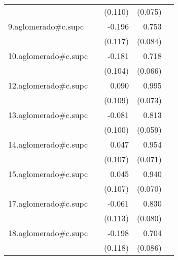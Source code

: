 {\begin{longtable}{l*{4}{D{.}{.}{-1}}}
            &                     &     (0.110)         &     (0.075)         &                     \\
\addlinespace
9.aglomerado#c.supc&                     &      -0.196         &       0.753\sym{***}&                     \\
            &                     &     (0.117)         &     (0.084)         &                     \\
\addlinespace
10.aglomerado#c.supc&                     &      -0.181         &       0.718\sym{***}&                     \\
            &                     &     (0.104)         &     (0.066)         &                     \\
\addlinespace
12.aglomerado#c.supc&                     &       0.090         &       0.995\sym{***}&                     \\
            &                     &     (0.109)         &     (0.073)         &                     \\
\addlinespace
13.aglomerado#c.supc&                     &      -0.081         &       0.813\sym{***}&                     \\
            &                     &     (0.100)         &     (0.059)         &                     \\
\addlinespace
14.aglomerado#c.supc&                     &       0.047         &       0.954\sym{***}&                     \\
            &                     &     (0.107)         &     (0.071)         &                     \\
\addlinespace
15.aglomerado#c.supc&                     &       0.045         &       0.940\sym{***}&                     \\
            &                     &     (0.107)         &     (0.070)         &                     \\
\addlinespace
17.aglomerado#c.supc&                     &      -0.061         &       0.830\sym{***}&                     \\
            &                     &     (0.113)         &     (0.080)         &                     \\
\addlinespace
18.aglomerado#c.supc&                     &      -0.198         &       0.704\sym{***}&                     \\
            &                     &     (0.118)         &     (0.086)         &                     \\

\end{longtable}}
